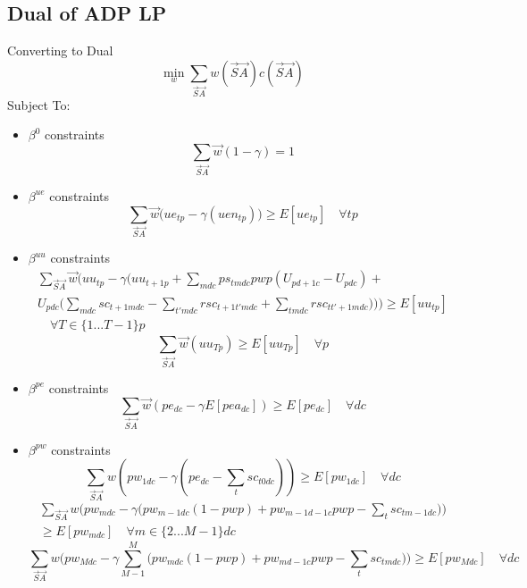 \documentclass{article}
\begin{document}
\subsection{Dual of ADP LP}
\label{Dual of ADP LP}
Converting to Dual
\begin{equation}
	\min_{w} \sum_{\vec{S} \vec{A}} w(\vec{S} \vec{A}) c(\vec{S} \vec{A})
\end{equation}
Subject To:
\begin{itemize}
	\item $\beta^{0}$ constraints
	\begin{equation}
		\sum_{\vec{S}\vec{A}}\vec{w} (1 - \gamma) = 1 
	\end{equation}
	
	\item $\beta^{ue}$ constraints	
	\begin{equation}
		\sum_{\vec{S}\vec{A}}\vec{w} \Big(ue_{tp} - \gamma (uen_{tp}) \Big) \ge E[ue_{tp}] \quad \forall tp
	\end{equation}	
	
	\item $\beta^{uu}$ constraints
	\begin{multline}
		\sum_{\vec{S}\vec{A}} \vec{w} \bigg( 
			uu_{tp}	 - \gamma \Big( uu_{t+1p} + \sum_{mdc} ps_{tmdc}pwp (U_{pd+1c} - U_{pdc}) + \\ 
			U_{pdc} \big( \sum_{mdc} sc_{t+1mdc}  - \sum_{t'mdc} rsc_{t+1t'mdc} + \sum_{tmdc} rsc_{tt'+1mdc} \big) \Big)
		\bigg) \ge E[uu_{tp}] \\
		\quad \forall T \in \{1...T-1\}p
	\end{multline}
	\begin{equation}
		\sum_{\vec{S}\vec{A}} \vec{w} (uu_{Tp}) \ge E[uu_{Tp}] \quad \forall p
	\end{equation}
	
	\item $\beta^{pe}$ constraints
	\begin{equation}
		\sum_{\vec{S}\vec{A}} \vec{w} (pe_{dc} - \gamma E[pea_{dc}])  \ge E[pe_{dc}] \quad \forall dc
	\end{equation}
	
	\item $\beta^{pw}$ constraints
	\begin{equation}
		  \sum_{\vec{S}\vec{A}}w  ( pw_{1dc} - \gamma (pe_{dc} - \sum_{t} sc_{t0dc})) \ge E[pw_{1dc}] \quad \forall dc
	\end{equation}
	\begin{multline}
		\sum_{\vec{S}\vec{A}}w  \Big( pw_{mdc} - \gamma \big( pw_{m-1dc} (1 - pwp) + pw_{m-1d-1c} pwp - \sum_{t} sc_{tm-1dc} \big) \Big) \\ 
		\ge E[pw_{mdc}]  \quad \forall m \in \{2 ... M-1 \}dc
	\end{multline}
	\begin{equation}
		\sum_{\vec{S}\vec{A}}w  \Big( pw_{Mdc} - \gamma \sum_{M-1}^{M}
			\big( pw_{mdc} (1 - pwp) + pw_{md-1c} pwp - \sum_{t} sc_{tmdc} \big) \Big) \ge E[pw_{Mdc}] \quad \forall dc
	\end{equation}
	

\end{itemize}
\end{document}
